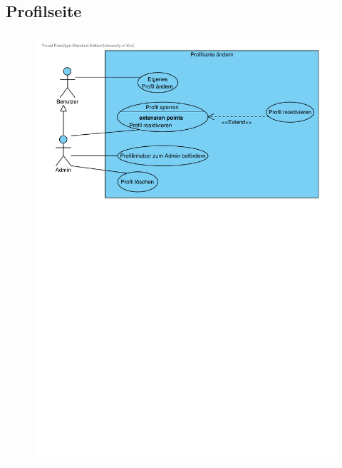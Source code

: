 \documentclass[10pt,a4paper]{article}
\begin{document}
\subsection{Profilseite}

	\begin{figure}[h!]
		\includegraphics[width=\linewidth]{gfx/webseite/Profilseite.pdf}
	\end{figure}
\end{document}
